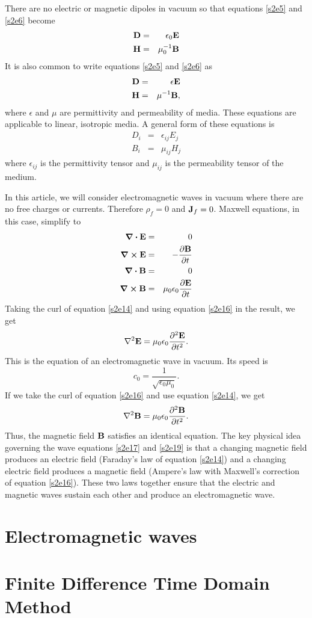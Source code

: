 \documentclass[11pt]{article}
\numberwithin{equation}{section}
\begin{document}
There are no electric or magnetic dipoles in vacuum so that equations
\eqref{s2e5} and \eqref{s2e6} become
\begin{eqnarray}
\vb{D} &=& \epsilon_0\vb{E} \label{s2e7} \\
\vb{H} &=& \mu_0^{-1}\vb{B} \label{s2e8}
\end{eqnarray}
It is also common to write equations \eqref{s2e5} and \eqref{s2e6} as
\begin{eqnarray}
\vb{D} &=& \epsilon\vb{E} \label{s2e9} \\
\vb{H} &=& \mu^{-1}\vb{B}, \label{s2e10}
\end{eqnarray}
where $\epsilon$ and $\mu$ are permittivity and permeability of media. These
equations are applicable to linear, isotropic media. A general form of these
equations is
\begin{eqnarray}
D_i &=& \epsilon_{ij}E_j \label{s2e11} \\
B_i &=& \mu_{ij}H_j \label{s2e12}
\end{eqnarray}
where $\epsilon_{ij}$ is the permittivity tensor and $\mu_{ij}$ is the
permeability tensor of the medium. 

In this article, we will consider electromagnetic waves in vacuum where there 
are no free charges or currents. Therefore $\rho_f = 0$ and $\vb{J}_f= 0$.
Maxwell equations, in this case, simplify to
\begin{eqnarray}
\div\vb{E} &=& 0 \label{s2e13} \\
\curl\vb{E} &=& -\pdv{\vb{B}}{t} \label{s2e14} \\
\div\vb{B} &=& 0 \label{s2e15} \\
\curl\vb{B} &=& \mu_0\epsilon_0\pdv{\vb{E}}{t} \label{s2e16}
\end{eqnarray}
Taking the curl of equation \eqref{s2e14} and using equation \eqref{s2e16}
in the result, we get
\begin{equation}\label{s2e17}
\laplacian\vb{E} = \mu_0\epsilon_0\pdv[2]{\vb{E}}{t}.
\end{equation}
This is the equation of an electromagnetic wave in vacuum. Its speed is
\begin{equation}\label{s2e18}
c_0 = \frac{1}{\sqrt{\epsilon_0\mu_0}}.
\end{equation}
If we take the curl of equation \eqref{s2e16} and use equation \eqref{s2e14},
we get
\begin{equation}\label{s2e19}
\laplacian\vb{B} = \mu_0\epsilon_0\pdv[2]{\vb{B}}{t}.
\end{equation}
Thus, the magnetic field $\vb{B}$ satisfies an identical equation. The key
physical idea governing the wave equations \eqref{s2e17} and \eqref{s2e19}
is that a changing magnetic field produces an electric field (Faraday's law
of equation \eqref{s2e14}) and a changing electric field produces a 
magnetic field (Ampere's law with Maxwell's correction of equation 
\eqref{s2e16}). These two laws together ensure that the electric and magnetic
waves sustain each other and produce an electromagnetic wave.

\section{Electromagnetic waves}\label{s3}
\section{Finite Difference Time Domain Method}\label{s4}



\end{document}
